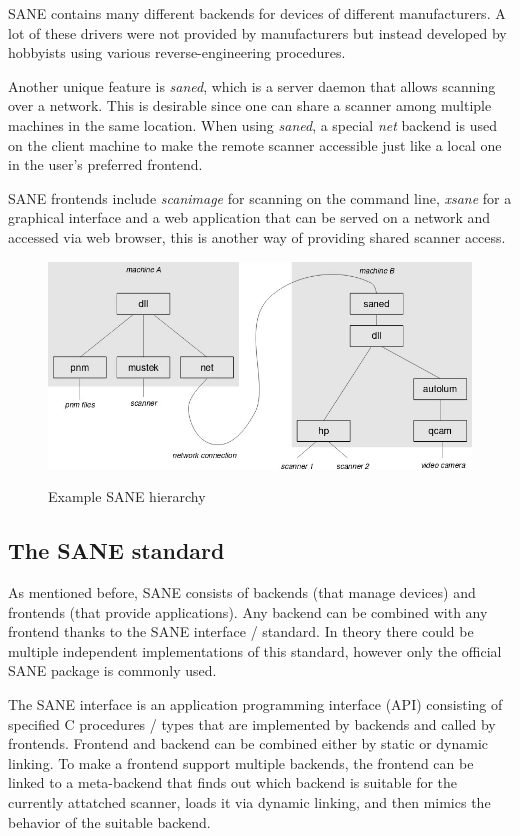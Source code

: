 \documentclass{article}
\begin{document}
SANE contains many different backends for devices of different manufacturers.
A lot of these drivers were not provided by manufacturers but instead
developed by hobbyists using various reverse-engineering procedures.

Another unique feature is {\it saned}, which is a server daemon that allows
scanning over a network. This is desirable since one can share a scanner
among multiple machines in the same location. When using {\it saned}, a
special {\it net} backend is used on the client machine to make
the remote scanner accessible just like a local one in the user's preferred frontend.

SANE frontends include {\it scanimage} for scanning on the command line,
{\it xsane} for a graphical interface and a web application that can be served
on a network and accessed via web browser, this is another way of providing shared
scanner access.

\begin{figure}[H]
  \caption{Example SANE hierarchy}
  \centering
  \includegraphics[width=\textwidth]{images/sane_hierarchy.jpg}
  \label{time_diagram}
\end{figure}

\subsection{The SANE standard}

As mentioned before, SANE consists of backends (that manage devices) and frontends
(that provide applications). Any backend can be combined with any frontend
thanks to the SANE interface / standard. In theory there could be multiple independent
implementations of this standard, however only the official SANE package is
commonly used.

The SANE interface is an application programming interface (API) consisting
of specified C procedures / types that are implemented by backends and called by frontends.
Frontend and backend can be combined either by static or dynamic linking.
To make a frontend support multiple backends, the frontend can be linked to a
meta-backend that finds out which backend is suitable for the currently attatched
scanner, loads it via dynamic linking, and then mimics the behavior
of the suitable backend.
\end{document}
